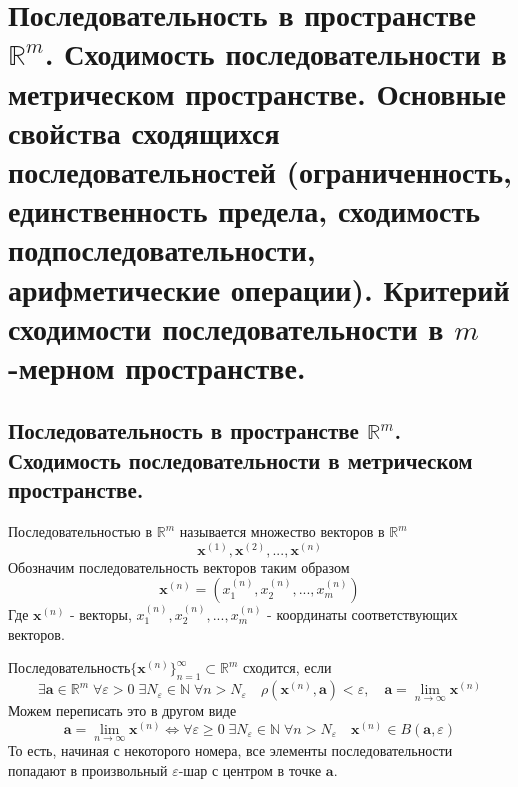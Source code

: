 \section{Последовательность в пространстве $\mathbb {R}^m$. Сходимость последовательности в метрическом пространстве. Основные свойства сходящихся последовательностей (ограниченность, единственность предела, сходимость подпоследовательности, арифметические операции). Критерий сходимости последовательности в $m$-мерном пространстве.}
\subsection{Последовательность в пространстве $\mathbb {R}^m$. Сходимость последовательности в метрическом пространстве.}
Последовательностью в $\mathbb {R}^m$ называется множество векторов в $\mathbb {R}^m$
$$
\textbf{x}^{(1)}, \textbf{x}^{(2)}, ..., \textbf{x}^{(n)}
$$
Обозначим последовательность векторов таким образом 
$$ \textbf{x}^{(n)} = (x^{(n)}_1, x^{(n)}_2, ..., x^{(n)}_m)$$
Где $\textbf{x}^{(n)}$ - векторы, $x^{(n)}_1, x^{(n)}_2, ..., x^{(n)}_m$ - координаты соответствующих векторов.

Последовательность$\{\textbf{x}^{(n)}\}^{\infty}_{n=1} \subset \mathbb {R}^m$ сходится, если 
$$
\exists \textbf {a} \in \mathbb {R}^m \; \forall \varepsilon > 0 \; \exists N_{\varepsilon} \in \mathbb {N} \; \forall n > N_{\varepsilon} \quad \rho(\textbf{x}^{(n)}, \textbf {a}) < {\varepsilon}, \quad \textbf {a} = \lim_{n\to\infty}{\textbf{x}^{(n)}}
$$
Можем переписать это в другом виде 
$$
\textbf {a} = \lim_{n\to\infty}{\textbf{x}^{(n)}} \Leftrightarrow \forall \varepsilon \geq 0 \; \exists N_{\varepsilon} \in \mathbb {N} \; \forall n > N_{\varepsilon} \quad \textbf{x}^{(n)} \in B(\textbf {a}, \varepsilon)
$$
То есть, начиная с некоторого номера, все элементы последовательности попадают в произвольный $\varepsilon$-шар с центром в точке $\textbf {a}$.
